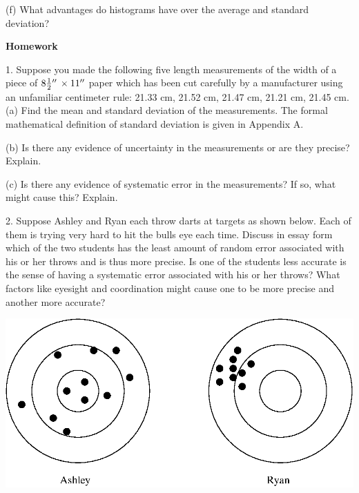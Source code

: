 (f) What advantages do histograms have over the average and standard deviation?
\vspace{20mm}

\newpage


\textbf{Homework} 

1. Suppose you made the following five length measurements of the width of a
piece of $8{1\over2} {}''\, \times 11''$ paper which has been cut carefully by
a manufacturer using an unfamiliar centimeter rule: 21.33 cm, 21.52 cm, 21.47
cm, 21.21 cm, 21.45 cm. (a) Find the mean and standard deviation of the measurements.
The formal mathematical definition of standard deviation 
is given in Appendix A. 
\vspace{30mm}

(b) Is there any evidence of uncertainty in the measurements or are they precise?
Explain. 
\vspace{20mm}

(c) Is there any evidence of systematic error in the measurements? If so, what
might cause this? Explain.
\vspace{20mm}

2. Suppose Ashley and Ryan each throw darts at targets as shown below. Each
of them is trying very hard to hit the bulls eye each time. Discuss in essay
form which of the two students has the least amount of random
error associated with his
or her throws and is thus more precise. Is one of the students less accurate
is the sense of having a systematic error associated with his or her throws?
What factors like eyesight and coordination might cause one to be more precise
and another more accurate?

\vspace{0.3cm}
{\par\centering \includegraphics{measurement_uncertainty/measurement_uncertainty_fig1.eps} \par}
\vspace{0.3cm}

